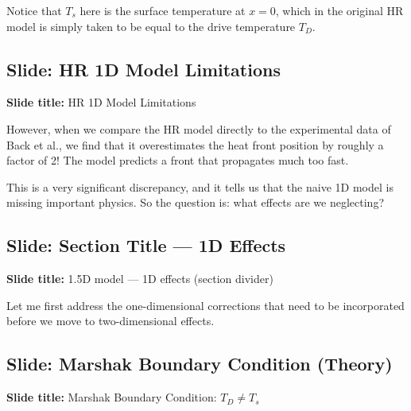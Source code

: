 \documentclass[12pt, a4paper]{article}
\begin{document}
Notice that $T_s$ here is the surface temperature at $x = 0$, which in the original HR model is simply taken to be equal to the drive temperature $T_D$.

\subsection{Slide: HR 1D Model Limitations}

\begin{slidebox}
\textbf{Slide title:} HR 1D Model Limitations
\end{slidebox}

However, when we compare the HR model directly to the experimental data of Back et al., we find that it overestimates the heat front position by roughly a factor of 2! The model predicts a front that propagates much too fast.

This is a very significant discrepancy, and it tells us that the naive 1D model is missing important physics. So the question is: what effects are we neglecting?

\subsection{Slide: Section Title --- 1D Effects}

\begin{slidebox}
\textbf{Slide title:} 1.5D model --- 1D effects (section divider)
\end{slidebox}

Let me first address the one-dimensional corrections that need to be incorporated before we move to two-dimensional effects.

\subsection{Slide: Marshak Boundary Condition (Theory)}

\begin{slidebox}
\textbf{Slide title:} Marshak Boundary Condition: $T_D \neq T_s$
\end{slidebox}
\end{document}
